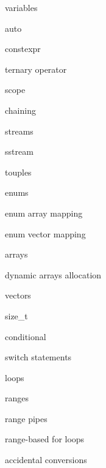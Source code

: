         variables

        auto
        
        constexpr 
        
         ternary operator
        
         scope
        
         chaining
        
         streams 
        
         sstream 

         touples

         enums

         enum array mapping

         enum vector mapping

         arrays

         dynamic arrays allocation

         vectors

         size_t 

         conditional

         switch statements

         loops

         ranges

         range pipes

         range-based for loops

         accidental conversions
        
